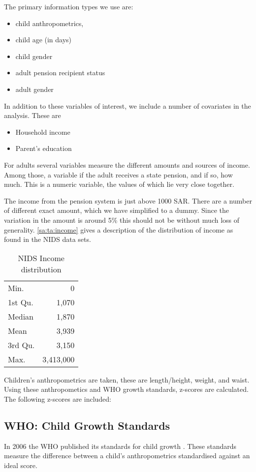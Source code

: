 \begin{refsection}
The primary information types we use are:
\begin{itemize}
  \item child anthropometrics,
  \item child age (in days)
  \item child gender
  \item adult pension recipient status
  \item adult gender
\end{itemize}
In addition to these variables of interest, we include a number of covariates in the analysis. These are
\begin{itemize}
  \item Household income
  \item Parent's education
\end{itemize}

For adults several variables measure the different amounts and sources of income.
Among those, a variable if the adult receives a state pension, and if so, how much.
This is a numeric variable, the values of which lie very close together.

The income from the pension system is just above 1000 SAR.
There are a number of different exact amount, which we have simplified to a dummy.
Since the variation in the amount is around 5\% this should not be without much loss of generality.
\autoref{sa:ta:income} gives a description of the distribution of income as found in the NIDS data sets.

\begin{table}[hb!]
\centering
\caption{NIDS Income distribution}
\label{sa:ta:income}
\begin{tabular}{l|r}
\hline
  Min. & 0 \\
  1st Qu. & 1,070 \\
  Median & 1,870 \\
  Mean & 3,939 \\
  3rd Qu. & 3,150 \\
  Max. & 3,413,000 \\
\end{tabular}
\end{table}

Children's anthropometrics are taken, these are length/height, weight, and waist.
Using these anthropometics and WHO growth standards, z-scores are calculated.
The following z-scores are included:


\subsection{WHO: Child Growth Standards}
\label{sa:data:who}
In 2006 the WHO published its standards for child growth \parencite{who2006child}.
These standards measure the difference between a child's anthropometrics
standardised against an ideal score.


\end{refsection}
